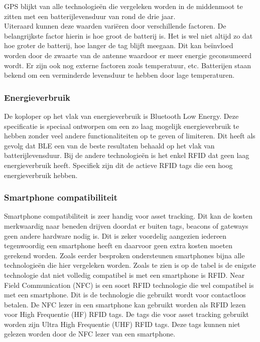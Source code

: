 GPS blijkt van alle technologieën die vergeleken worden in de middenmoot te zitten met een batterijlevensduur van rond de drie jaar.\\

Uiteraard kunnen deze waarden variëren door verschillende factoren. De belangrijkste factor hierin is hoe groot de batterij is. Het is wel niet altijd zo dat hoe groter de batterij, hoe langer de tag blijft meegaan. Dit kan beïnvloed worden door de zwaarte van de antenne waardoor er meer energie geconsumeerd wordt. Er zijn ook nog externe factoren zoals temperatuur, etc. Batterijen staan bekend om een verminderde levensduur te hebben door lage temperaturen.

\subsubsection{Energieverbruik}

De koploper op het vlak van energieverbruik is Bluetooth Low Energy. Deze specificatie is speciaal ontworpen om een zo laag mogelijk energieverbruik te hebben zonder veel andere functionaliteiten op te geven of limiteren. Dit heeft als gevolg dat BLE een van de beste resultaten behaald op het vlak van batterijlevensduur. Bij de andere technologieën is het enkel RFID dat geen laag energieverbruik heeft. Specifiek zijn dit de actieve RFID tags die een hoog energieverbruik hebben.

\subsubsection{Smartphone compatibiliteit}
Smartphone compatibiliteit is zeer handig voor asset tracking. Dit kan de kosten merkwaardig naar beneden drijven doordat er buiten tags, beacons of gateways geen andere hardware nodig is. Dit is zeker voordelig aangezien iedereen tegenwoordig een smartphone heeft en daarvoor geen extra kosten moeten gerekend worden. Zoals eerder besproken ondersteunen smartphones bijna alle technologieën die hier vergeleken worden. Zoals te zien is op de tabel is de enigste technologie dat niet volledig compatibel is met een smartphone is RFID. Near Field Communication (NFC) is een soort RFID technologie die wel compatibel is met een smartphone. Dit is de technologie die gebruikt wordt voor contactloos betalen. De NFC lezer in een smartphone kan gebruikt worden als RFID lezen voor High Frequentie (HF) RFID tags. De tags die voor asset tracking gebruikt worden zijn Ultra High Frequentie (UHF) RFID tags. Deze tags kunnen niet gelezen worden door de NFC lezer van een smartphone.


